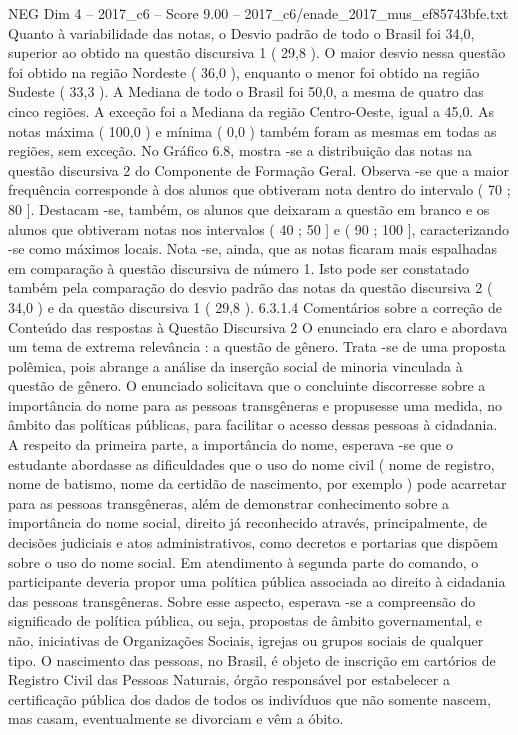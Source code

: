\begin{textsample}{NEG Dim 4 – 2017\_c6 – Score 9.00 – 2017\_c6/enade\_2017\_mus\_ef85743bfe.txt}
Quanto à variabilidade das notas, o Desvio padrão de todo o Brasil foi 34,0, superior ao obtido na questão discursiva 1 ( 29,8 ).
O maior desvio nessa questão foi obtido na região Nordeste ( 36,0 ), enquanto o menor foi obtido na região Sudeste ( 33,3 ).
A Mediana de todo o Brasil foi 50,0, a mesma de quatro das cinco regiões.
A exceção foi a Mediana da região Centro-Oeste, igual a 45,0.
As notas máxima ( 100,0 ) e mínima ( 0,0 ) também foram as mesmas em todas as regiões, sem exceção.
No Gráfico 6.8, mostra -se a distribuição das notas na questão discursiva 2 do Componente de Formação Geral.
Observa -se que a maior frequência corresponde à dos alunos que obtiveram nota dentro do intervalo ( 70 ; 80 ].
Destacam -se, também, os alunos que deixaram a questão em branco e os alunos que obtiveram notas nos intervalos ( 40 ; 50 ] e ( 90 ; 100 ], caracterizando -se como máximos locais.
Nota -se, ainda, que as notas ficaram mais espalhadas em comparação à questão discursiva de número 1.
Isto pode ser constatado também pela comparação do desvio padrão das notas da questão discursiva 2 ( 34,0 ) e da questão discursiva 1 ( 29,8 ). 6.3.1.4 Comentários sobre a correção de Conteúdo das respostas à Questão Discursiva 2 O enunciado era claro e abordava um tema de extrema relevância : a questão de gênero.
Trata -se de uma proposta polêmica, pois abrange a análise da inserção social de minoria vinculada à questão de gênero.
O enunciado solicitava que o concluinte discorresse sobre a importância do nome para as pessoas transgêneras e propusesse uma medida, no âmbito das políticas públicas, para facilitar o acesso dessas pessoas à cidadania.
A respeito da primeira parte, a importância do nome, esperava -se que o estudante abordasse as dificuldades que o uso do nome civil ( nome de registro, nome de batismo, nome da certidão de nascimento, por exemplo ) pode acarretar para as pessoas transgêneras, além de demonstrar conhecimento sobre a importância do nome social, direito já reconhecido através, principalmente, de decisões judiciais e atos administrativos, como decretos e portarias que dispõem sobre o uso do nome social.
Em atendimento à segunda parte do comando, o participante deveria propor uma política pública associada ao direito à cidadania das pessoas transgêneras.
Sobre esse aspecto, esperava -se a compreensão do significado de política pública, ou seja, propostas de âmbito governamental, e não, iniciativas de Organizações Sociais, igrejas ou grupos sociais de qualquer tipo.
O nascimento das pessoas, no Brasil, é objeto de inscrição em cartórios de Registro Civil das Pessoas Naturais, órgão responsável por estabelecer a certificação pública dos dados de todos os indivíduos que não somente nascem, mas casam, eventualmente se divorciam e vêm a óbito.

\end{textsample}
